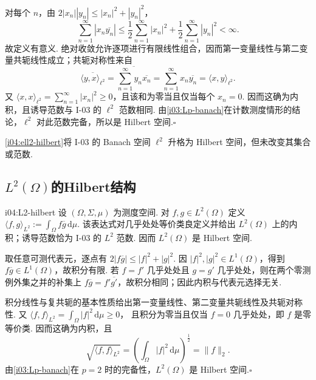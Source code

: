 \begin{FAProof}
对每个 \(\displaystyle n\)，由 \(\displaystyle 2|x_n||y_n|\leqslant|x_n|^2+|y_n|^2\)，
\[
\sum_{n=1}^{\infty}|x_n\overline{y_n}|
\leqslant\frac12\sum_{n=1}^{\infty}|x_n|^2
+\frac12\sum_{n=1}^{\infty}|y_n|^2
<\infty.
\]
故定义有意义. 绝对收敛允许逐项进行有限线性组合，因而第一变量线性与第二变量共轭线性成立；共轭对称性来自
\[
\overline{\langle y,x\rangle_{\ell^2}}
=\overline{\sum_{n=1}^{\infty}y_n\overline{x_n}}
=\sum_{n=1}^{\infty}x_n\overline{y_n}
=\langle x,y\rangle_{\ell^2}.
\]
又 \(\displaystyle \langle x,x\rangle_{\ell^2}=\sum_{n=1}^{\infty}|x_n|^2\geqslant0\)，且该和为零当且仅当每个 \(\displaystyle x_n=0\). 因而这确为内积，且诱导范数与 I-03 的 \(\displaystyle \ell^2\) 范数相同. 由\autoref{i03:Lp-banach}在计数测度情形的结论，\(\displaystyle \ell^2\) 对此范数完备，所以是 Hilbert 空间.\hfill\(\square\)

\end{FAProof}

\begin{FAExample}[序列Hilbert空间]
\autoref{i04:ell2-hilbert}将 I-03 的 Banach 空间 \(\displaystyle \ell^2\) 升格为 Hilbert 空间，但未改变其集合或范数.
\end{FAExample}

\subsection{\texorpdfstring{\(\displaystyle L^2(\Omega)\)}{L^2}的Hilbert结构}

\begin{FAProposition}{i04:L2-hilbert}
设 \(\displaystyle (\Omega,\Sigma,\mu)\) 为测度空间. 对 \(\displaystyle f,g\in L^2(\Omega)\) 定义 \(\displaystyle \langle f,g\rangle_{L^2} :=\int_\Omega f\overline g\,\mathrm{d}\mu\).
该表达式对几乎处处等价类良定义并给出 \(\displaystyle L^2(\Omega)\) 上的内积；诱导范数恰为 I-03 的 \(\displaystyle L^2\) 范数. 因而 \(\displaystyle L^2(\Omega)\) 是 Hilbert 空间.
\end{FAProposition}

\begin{FAProof}
取任意可测代表元，逐点有 \(\displaystyle 2|f\overline g|\leqslant|f|^2+|g|^2\). 因 \(\displaystyle |f|^2,|g|^2\in L^1(\Omega)\)，得到 \(\displaystyle f\overline g\in L^1(\Omega)\)，故积分有限. 若 \(\displaystyle f=f'\) 几乎处处且 \(\displaystyle g=g'\) 几乎处处，则在两个零测例外集之并的补集上 \(\displaystyle f\overline g=f'\overline{g'}\)，故积分相同；因此内积与代表元选择无关.

积分线性与复共轭的基本性质给出第一变量线性、第二变量共轭线性及共轭对称性. 又 \(\displaystyle \langle f,f\rangle_{L^2} =\int_\Omega|f|^2\,\mathrm{d}\mu \geqslant0\)，
且积分为零当且仅当 \(\displaystyle f=0\) 几乎处处，即 \(\displaystyle f\) 是零等价类. 因而这确为内积，且
\[
\sqrt{\langle f,f\rangle_{L^2}}
=\left(\int_\Omega|f|^2\,\mathrm{d}\mu\right)^{\frac{1}{2}}
=\|f\|_2.
\]
由\autoref{i03:Lp-banach}在 \(\displaystyle p=2\) 时的完备性，\(\displaystyle L^2(\Omega)\) 是 Hilbert 空间.\hfill\(\square\)

\end{FAProof}

